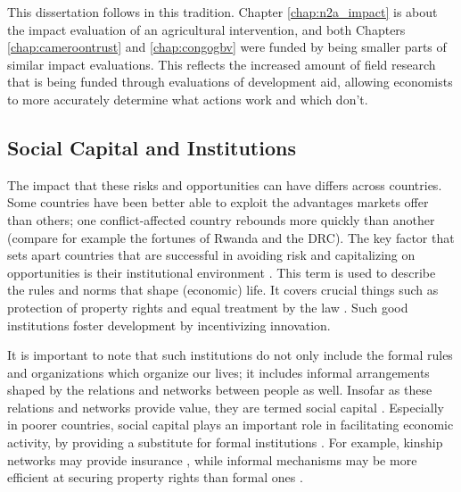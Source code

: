 This dissertation follows in this tradition. Chapter \ref{chap:n2a_impact} is about the impact evaluation of an agricultural intervention, and both Chapters \ref{chap:cameroontrust} and \ref{chap:congogbv} were funded by being smaller parts of similar impact evaluations. This reflects the increased amount of field research that is being funded through evaluations of development aid, allowing economists to more accurately determine what actions work and which don't.

\subsection{Social Capital and Institutions}
The impact that these risks and opportunities can have differs across countries. Some countries have been better able to exploit the advantages markets offer than others; one conflict-affected country rebounds more quickly than another (compare for example the fortunes of Rwanda and the DRC). The key factor that sets apart countries that are successful in avoiding risk and capitalizing on opportunities is their institutional environment \citep{Rodrik2004,Acemoglu2000}. This term is used to describe the rules and norms that shape (economic) life. It covers crucial things such as protection of property rights and equal treatment by the law \citep{Acemoglu2005}. Such good institutions  foster development by incentivizing innovation. %

It is important to note that such institutions do not only include the formal rules and organizations which organize our lives; it includes informal arrangements shaped by the relations and networks between people as well. Insofar as these relations and networks provide value, they are termed social capital \citep[see for a more detailed discussion of the definition of the term][]{Putnam2001}. Especially in poorer countries, social capital plays an important role in facilitating economic activity, by providing a substitute for formal institutions \citep{Knack1997}. For example, kinship networks may provide insurance \citep{DiFalco2011}, while informal mechanisms may be more efficient at securing property rights than formal ones \citep{Platteau1996}. 

